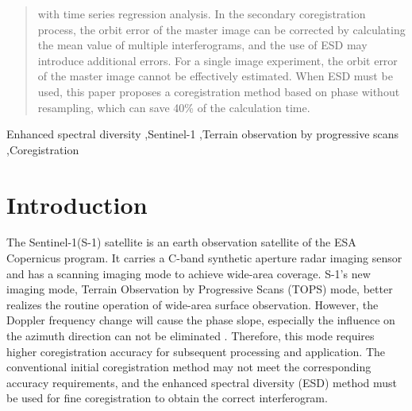 \documentclass[a4paper,fleqn]{cas-sc}
\begin{document}
\begin{abstract}
with time series regression analysis. In the secondary coregistration process, the orbit error of the master image can be corrected by calculating the mean value of multiple interferograms, and the use of ESD may introduce additional errors. For a single image experiment, the orbit error of the master image cannot be effectively estimated. When ESD must be used, this paper proposes a coregistration method based on phase without resampling, which can save 40\% of the calculation time.
\end{abstract}


\begin{highlights}
\item 
\item 
\item 
\end{highlights}

\begin{keywords}
Enhanced spectral diversity \sep Sentinel-1 \sep Terrain observation by progressive scans \sep Coregistration
\end{keywords}

\maketitle

\section{Introduction}\label{Introduction}

The Sentinel-1(S-1) satellite is an earth observation satellite of the ESA Copernicus program. It carries a C-band synthetic aperture radar imaging sensor and has a scanning imaging mode to achieve wide-area coverage. S-1’s new imaging mode, Terrain Observation by Progressive Scans (TOPS) mode, better realizes the routine operation of wide-area surface observation. However, the Doppler frequency change will cause the phase slope, especially the influence on the azimuth direction can not be eliminated \cite{A_Study_of_Sentinel-1_TOPS_Mode_Co-registration}. Therefore, this mode requires higher coregistration accuracy for subsequent processing and application. The conventional initial coregistration method may not meet the corresponding accuracy requirements, and the enhanced spectral diversity (ESD) method must be used for fine coregistration to obtain the correct interferogram. \par
\end{document}
